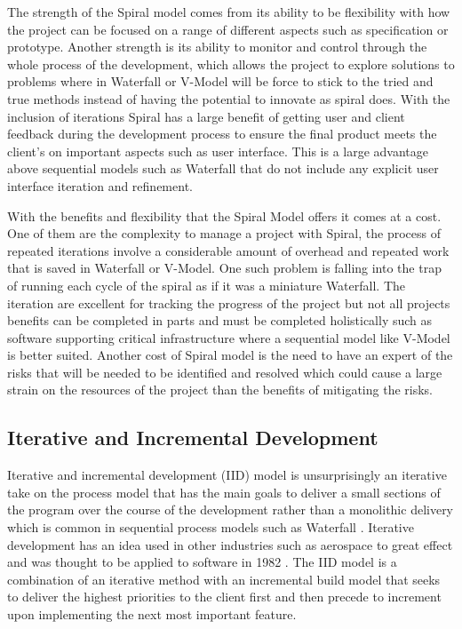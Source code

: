 \documentclass{style/CRPITStyle}
\renewcommand{\cite}{\citep}
\begin{document}
\vspace{.1in}

The strength of the Spiral model comes from its ability to be
flexibility with how the project can be focused on a range of
different aspects such as specification or prototype.
Another strength is its ability to monitor and control through the whole process
of the development, which allows the project to explore solutions to problems
where in Waterfall or V-Model will be force to stick to the tried and true
methods instead of having the potential to innovate as spiral does.
With the inclusion of iterations Spiral has a large benefit of getting user and
client feedback during the development process to ensure the final product meets
the client's on important aspects such as user interface. This is a large
advantage above sequential models such as Waterfall that do not include any
explicit user interface iteration and refinement.

\vspace{.1in}

With the benefits and flexibility that the Spiral Model offers it comes at a
cost. 
One of them are the complexity to manage a project with Spiral, the process of
repeated iterations involve a considerable amount of overhead and repeated work
that is saved in Waterfall or V-Model. One such
problem is falling into the trap of running each cycle of the spiral as if it
was a miniature Waterfall.
The iteration are excellent for tracking the progress of the project but not all
projects benefits can be completed in parts and must be completed holistically
such as software supporting critical infrastructure where a sequential model
like V-Model is better suited.
Another cost of Spiral model is the need to have an expert of the risks that
will be needed to be identified and resolved which could cause a large strain on the
resources of the project than the benefits of mitigating the risks.

\vspace{.1in}

\subsection{Iterative and Incremental Development} %

Iterative and incremental development (IID) model is unsurprisingly an iterative take on the
process model that has the main goals to deliver a small sections of the program
over the course of the development rather than a monolithic delivery which is
common in sequential process models such as Waterfall \cite{greer:2004:iid}.
Iterative development has an idea used in other industries such as aerospace to 
great effect and was thought to be applied to software in 1982 \cite{larman:2003:iid}.
The IID model is a combination of an iterative method with an incremental build
model that seeks to deliver the highest priorities to the client first and then
precede to increment upon implementing the next most important feature.
\end{document}

